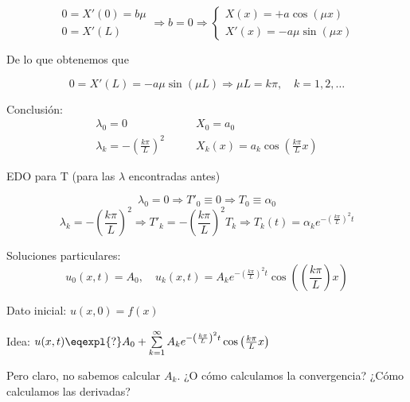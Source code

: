 \begin{example}
\begin{itemize}
			 	\[
			 		\begin{array}{l}
			 		0 = X'(0) = b \mu \\
			 		0 = X'(L)
			 		\end{array} \Rightarrow b = 0 \Rightarrow \left\{ \begin{array}{l}
			 			X(x) = + a \cos (\mu x ) \\
			 			X'(x) = -a \mu \sin (\mu x)
			 		\end{array} \right.
			 	\]

			 	De lo que obtenemos que

			 	\[0 = X'(L) = -a \mu \sin(\mu L) \Rightarrow \mu L = k \pi , \quad k = 1,2,…\]



		\end{itemize}

		Conclusión:
				\begin{align*}
					\lambda_0 = 0\quad & \quad X_0 = a_0 \\
					\lambda_k = - \left(\frac{k\pi}{L}\right)^2\quad & \quad X_k(x) = a_k \cos \left(\frac{k \pi}{L}x\right)
				\end{align*}

			 	EDO para T (para las $\lambda$ encontradas antes)

			 	\[\lambda_0 = 0 \Rightarrow T'_0 \equiv 0 \Rightarrow T_0 \equiv \alpha_0\]
			 	\[\lambda_k = - \left(\frac{k\pi}{L}\right)^2 \Rightarrow T'_k = -\left(\frac{k\pi}{L}\right)^2 T_k \Rightarrow T_k (t) = \alpha_k e^{-\left(\frac{k\pi}{L}\right)^2 t} \]

			 	Soluciones particulares:
			 	\[u_0(x,t) = A_0, \quad u_k (x,t) = A_k e^{-\left(\frac{k \pi}{L} \right)^2 t} \cos \left( \left( \frac{k \pi}{L}\right) x \right) \]

			 	Dato inicial: $u(x,0) = f(x)$

			 	Idea: $u(x,t) \eqexpl{?} A_0 + \sum\limits_{k=1}^{\infty} A_k e^{- \left( \frac{k \pi}{L} \right)^2 t}  \cos \left( \frac{k \pi}{L} x \right)$

			 	Pero claro, no sabemos calcular $A_k$. ¿O cómo calculamos la convergencia? ¿Cómo calculamos las derivadas?


		\end{example}

